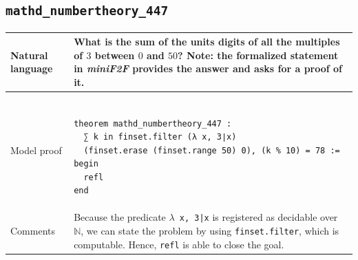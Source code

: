 \documentclass[nohyperref]{article}
\theoremstyle{plain}
\theoremstyle{definition}
\theoremstyle{remark}
\begin{document}
\subsection*{\texttt{mathd\_numbertheory\_447}} \label{exprob1}
\begin{table}[h]
\begin{small}
\begin{tabular}{|p{3.5cm}|p{12.5cm}|} 
  \hline 
  Natural language & 
  \begin{minipage}{12.5 cm}
    What is the sum of the units digits of all the multiples of $3$ between $0$ and $50$? \textbf{Note}: the formalized statement in \textit{miniF2F} provides the answer and asks for a proof of it.
  \end{minipage} \\
  \hline 
  \centering Model proof & 
  \begin{minipage}{12.5 cm}
    \begin{verbatim} 
  
theorem mathd_numbertheory_447 :
  ∑ k in finset.filter (λ x, 3∣x) 
  (finset.erase (finset.range 50) 0), (k % 10) = 78 :=
begin
  refl
end
    \end{verbatim} 
  \end{minipage}\\
  \hline 
  \centering Comments & Because the predicate \texttt{$\lambda$ x, 3|x} is registered as decidable over $\mathbb{N}$, we can state the problem by using \texttt{finset.filter}, which is computable. Hence, \texttt{refl} is able to close the goal.   \\
  \hline
\end{tabular}
\end{small}
\end {table}
\end{document}
